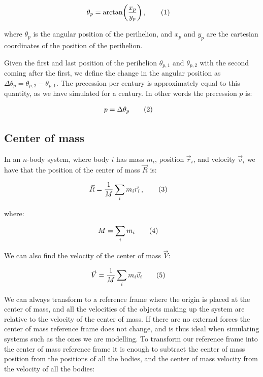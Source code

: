\documentclass[reprint,english,notitlepage]{revtex4-1}  %
\newcommand\numberthis{\addtocounter{equation}{1}\tag{\theequation}}
\begin{document}
\begin{align*}
\theta_p &= \arctan(\frac{x_p}{y_p}) \, ,\numberthis \label{eq:prec_ang_pos}
\end{align*}

where $\theta_p$ is the angular position of the perihelion, and $x_p$ and $y_p$ are the cartesian coordinates of the position of the perihelion.

Given the first and last position of the perihelion $\theta_{p,1}$ and $\theta_{p,2}$ with the second coming after the first, we define the change in the angular position as $\Delta \theta_p = \theta_{p,2} - \theta_{p,1}$. The precession per century is approximately equal to this quantity, as we have simulated for a century. In other words the precession $p$ is:

\begin{align*}
p &= \Delta \theta_p \numberthis \label{eq:precession}
\end{align*}

\subsection{Center of mass} \label{sec:II:g}

In an $n$-body system, where body $i$ has mass $m_i$, position $\vec{r}_i$, and velocity $\vec{v}_i$ we have that the position of the center of mass $\vec{R}$ is:

\begin{align*}
\vec{R} &= \frac{1}{M}\sum\limits_i m_i \vec{r}_i \, , \numberthis \label{eq:cofm_pos}
\end{align*}

where:

\begin{align*}
M &= \sum\limits_i m_i \numberthis \label{eq:tot_mass}
\end{align*}

We can also find the velocity of the center of mass $\vec{V}$:

\begin{align*}
\vec{V} &= \frac{1}{M} \sum\limits_i m_i \vec{v}_i \numberthis \label{eq:cofm_vel}
\end{align*}

We can always transform to a reference frame where the origin is placed at the center of mass, and all the velocities of the objects making up the system are relative to the velocity of the center of mass. If there are no external forces the center of mass reference frame does not change, and is thus ideal when simulating systems such as the ones we are modelling. To transform our reference frame into the center of mass reference frame it is enough to subtract the center of mass position from the positions of all the bodies, and the center of mass velocity from the velocity of all the bodies:
\end{document}
